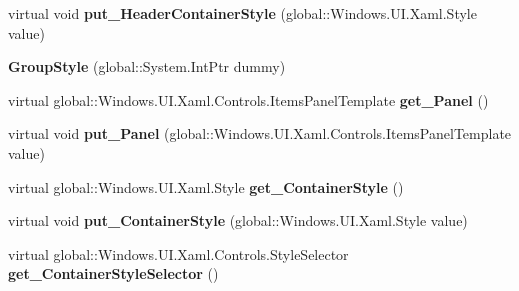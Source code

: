\begin{DoxyCompactItemize}
\mbox{\label{class_windows_1_1_u_i_1_1_xaml_1_1_controls_1_1_group_style_aab18a3e263942f9bedd80679e89e0fba}} 
virtual void {\bfseries put\+\_\+\+Header\+Container\+Style} (global\+::\+Windows.\+U\+I.\+Xaml.\+Style value)
\item 
\mbox{\label{class_windows_1_1_u_i_1_1_xaml_1_1_controls_1_1_group_style_a48ddd6c81df5d4b20a17360153322649}} 
{\bfseries Group\+Style} (global\+::\+System.\+Int\+Ptr dummy)
\item 
\mbox{\label{class_windows_1_1_u_i_1_1_xaml_1_1_controls_1_1_group_style_a3c268ef18089368deaadd594eb77b93f}} 
virtual global\+::\+Windows.\+U\+I.\+Xaml.\+Controls.\+Items\+Panel\+Template {\bfseries get\+\_\+\+Panel} ()
\item 
\mbox{\label{class_windows_1_1_u_i_1_1_xaml_1_1_controls_1_1_group_style_abdff045e22bd9e3c822ebdbb721ca0cd}} 
virtual void {\bfseries put\+\_\+\+Panel} (global\+::\+Windows.\+U\+I.\+Xaml.\+Controls.\+Items\+Panel\+Template value)
\item 
\mbox{\label{class_windows_1_1_u_i_1_1_xaml_1_1_controls_1_1_group_style_aca3b627e4f154a3c71dfb861be9a9d70}} 
virtual global\+::\+Windows.\+U\+I.\+Xaml.\+Style {\bfseries get\+\_\+\+Container\+Style} ()
\item 
\mbox{\label{class_windows_1_1_u_i_1_1_xaml_1_1_controls_1_1_group_style_abb8477a846bdaf75ee930b67c2f7d88d}} 
virtual void {\bfseries put\+\_\+\+Container\+Style} (global\+::\+Windows.\+U\+I.\+Xaml.\+Style value)
\item 
\mbox{\label{class_windows_1_1_u_i_1_1_xaml_1_1_controls_1_1_group_style_a2de61fd35bfccb41a006bc9635ed88ec}} 
virtual global\+::\+Windows.\+U\+I.\+Xaml.\+Controls.\+Style\+Selector {\bfseries get\+\_\+\+Container\+Style\+Selector} ()
\item 
\mbox{\label{class_windows_1_1_u_i_1_1_xaml_1_1_controls_1_1_group_style_a87a315fbb444d0a30f115de2f3729cc7}} 

\end{DoxyCompactItemize}

